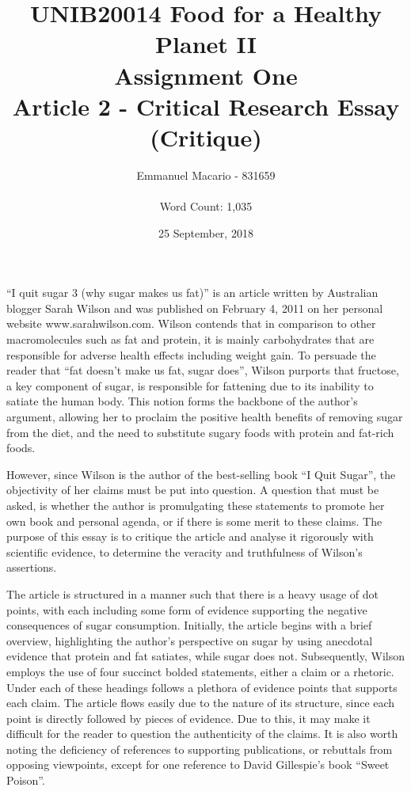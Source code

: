 \documentclass[12pt]{article}
\author{Emmanuel Macario - 831659\\\\Word Count: 1,035}
\title{UNIB20014 Food for a Healthy Planet II \\ Assignment One\\ Article 2 - Critical Research Essay (Critique)}
\date{25 September, 2018}
\begin{document}
\maketitle

\pagebreak
“I quit sugar 3 (why sugar makes us fat)” is an article written by Australian blogger Sarah Wilson and was published on February 4, 2011 on her personal website www.sarahwilson.com. Wilson contends that in comparison to other macromolecules such as fat and protein, it is mainly carbohydrates that are responsible for adverse health effects including weight gain. To persuade the reader that “fat doesn’t make us fat, sugar does”, Wilson purports that fructose, a key component of sugar, is responsible for fattening due to its inability to satiate the human body. This notion forms the backbone of the author’s argument, allowing her to proclaim the positive health benefits of removing sugar from the diet, and the need to substitute sugary foods with protein and fat-rich foods.

\bigskip
However, since Wilson is the author of the best-selling book “I Quit Sugar”, the objectivity of her claims must be put into question. A question that must be asked, is whether the author is promulgating these statements to promote her own book and personal agenda, or if there is some merit to these claims. The purpose of this essay is to critique the article and analyse it rigorously with scientific evidence, to determine the veracity and truthfulness of Wilson’s assertions.

\bigskip
The article is structured in a manner such that there is a heavy usage of dot points, with each including some form of evidence supporting the negative consequences of sugar consumption. Initially, the article begins with a brief overview, highlighting the author’s perspective on sugar by using anecdotal evidence that protein and fat satiates, while sugar does not. Subsequently, Wilson employs the use of four succinct bolded statements, either a claim or a rhetoric. Under each of these headings follows a plethora of evidence points that supports each claim. The article flows easily due to the nature of its structure, since each point is directly followed by pieces of evidence. Due to this, it may make it difficult for the reader to question the authenticity of the claims. It is also worth noting the deficiency of references to supporting publications, or rebuttals from opposing viewpoints, except for one reference to David Gillespie’s book “Sweet Poison”.
\end{document}
